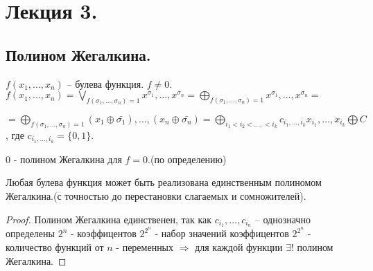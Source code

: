 %

\section{Лекция 3.}
\subsection{Полином Жегалкина.} 
$f(x_1, \ldots, x_n)$ -- булева функция. $f\neq 0$. \\
$f(x_1, \ldots, x_n)=\bigvee \limits_{f(\sigma_1, \ldots, \sigma_n)=1} x^{\sigma_1}, \ldots, x^{\sigma_n}=\bigoplus \limits_{f(\sigma_1, \ldots, \sigma_n)=1} x^{\sigma_1}, \ldots, x^{\sigma_n}=$ 
\begin{flushright}
$
=\bigoplus \limits_{f(\sigma_1, \ldots, \sigma_n)=1} (x_1\oplus \bar{\sigma_1}),\ldots,(x_n\oplus \bar{\sigma_n})=\bigoplus \limits_{i_1<i_2< \ldots,<i_k} c_{i_1, \ldots, i_k}x_{i_1}, \ldots ,x_{i_k} \bigoplus C $, где  $c_{i_1, \ldots, i_k}=\{0,1\}$.
\end{flushright} 
$0$ - полином Жегалкина для $f=0$.(по определению) 

\begin{statement}
	Любая булева функция может быть реализована единственным полиномом Жегалкина.(с точностью до перестановки слагаемых и сомножителей). 
\end{statement}
\begin{proof}
	Полином Жегалкина единственен, так как $c_{i_1}, \ldots, c_{i_n}$ -- однозначно определены $2^n$ -  коэффицентов $2^{2^n}$ - набор значений коэффицентов $2^{2^n}$ - количество функций от $n$ - переменных $\Rightarrow$ для каждой функции $\exists !$ полином Жегалкина. 
\end{proof}
